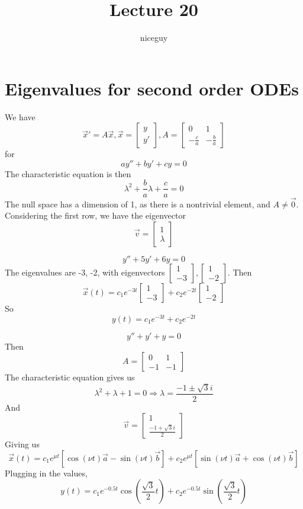 \documentclass[12pt]{article}
\author{niceguy}
\title{Lecture 20}
\begin{document}
\maketitle

\section{Eigenvalues for second order ODEs}
We have
$$\vec{x}' = A\vec{x}, \vec{x} = \begin{bmatrix} y \\ y'\end{bmatrix}, A = \begin{bmatrix} 0 & 1 \\ -\frac{c}{a} & -\frac{b}{a}\end{bmatrix}$$
for
$$ay'' + by' + cy = 0$$
The characteristic equation is then
$$\lambda^2 + \frac{b}{a}\lambda + \frac{c}{a} = 0$$
The null space has a dimension of 1, as there is a nontrivial element, and $A \neq \vec{0}$. Considering the first row, we have the eigenvector
$$\vec{v} = \begin{bmatrix} 1 \\ \lambda\end{bmatrix}$$ 

\begin{ex}
	$$y'' + 5y' + 6y = 0$$
	The eigenvalues are -3, -2, with eigenvectors $\begin{bmatrix} 1 \\ -3\end{bmatrix}, \begin{bmatrix} 1 \\ -2\end{bmatrix}$.
	Then
	$$\vec{x}(t) = c_1e^{-3t}\begin{bmatrix} 1 \\ -3\end{bmatrix} + c_2e^{-2t} \begin{bmatrix} 1 \\ -2\end{bmatrix}$$
	So
	$$y(t) = c_1e^{-3t} + c_2e^{-2t}$$
\end{ex}

\begin{ex}
	$$y'' + y' + y = 0$$
	Then
	$$A = \begin{bmatrix} 0 & 1 \\ -1 & -1\end{bmatrix}$$
	The characteristic equation gives us
	$$\lambda^2 + \lambda + 1 = 0 \Rightarrow \lambda = \frac{-1\pm\sqrt{3}i}{2}$$
	And
	$$\vec{v} = \begin{bmatrix} 1 \\ \frac{-1+\sqrt{3}i}{2}\end{bmatrix}$$
	Giving us
	$$\vec{x}(t) = c_1e^{\mu t}[\cos(\nu t)\vec{a} - \sin(\nu t)\vec{b}] + c_2e^{\mu t}[\sin(\nu t)\vec{a} + \cos(\nu t)\vec{b}]$$
	Plugging in the values,
	$$y(t) = c_1e^{-0.5t}\cos\left(\frac{\sqrt{3}}{2}t\right) + c_2e^{-0.5t}\sin\left(\frac{\sqrt{3}}{2}t\right)$$
\end{ex}
\end{document}
